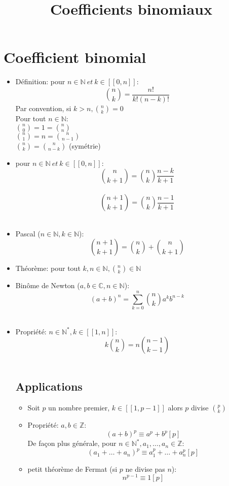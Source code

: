 \documentclass{article}
\title{Coefficients binomiaux}
\date{}
\begin{document}
\maketitle

\section{Coefficient binomial}
\begin{itemize}
	\item D\'{e}finition: pour \(n \in \mathbb{N}\ et\ k \in [\![0,n]\!]\): \\
	\[ \binom{n}{k} = \frac{n!}{k!(n-k)!} \]
	Par convention, si \(k>n, \binom{n}{k} = 0\) \\
	Pour tout \(n \in \mathbb{N}:\) \\
	\(\binom{n}{0} = 1 = \binom{n}{n}\) \\
	\(\binom{n}{1} = n = \binom{n}{n-1}\) \\
	\(\binom{n}{k} = \binom{n}{n-k}\) (sym\'{e}trie) \\
	\item pour \(n \in \mathbb{N}\ et\ k \in [\![0,n]\!]\): \\
	\[\binom{n}{k+1} = \binom{n}{k} \frac{n-k}{k+1}\] \\
	\[\binom{n+1}{k+1} = \binom{n}{k} \frac{n-1}{k+1}\] \\
	\item Pascal (\(n \in \mathbb{N}, k \in \mathbb{N}\)): \\
	\[\binom{n+1}{k+1} = \binom{n}{k} + \binom{n}{k+1}\]
	\item Th\'{e}or\`{e}me: pour tout \(k,n \in \mathbb{N}, \binom{n}{k} \in \mathbb{N}\) \\
	\item Bin\^{o}me de Newton (\(a,b \in \mathbb{C}, n \in \mathbb{N}\)): \\
	\[(a+b)^n = \sum_{k=0}^{n} \binom{n}{k}a^kb^{n-k}\] \\
	\item Propri\'{e}t\'{e}: \(n \in \mathbb{N}^*, k \in [\![1,n]\!]\): \\
	\[k\binom{n}{k} = n\binom{n-1}{k-1}\] \\
	\subsection{Applications}
	\begin{itemize}
		\item Soit \(p\) un nombre premier, \(k \in [\![1,p-1]\!]\) alors \(p\) divise \(\binom{p}{k}\) \\
		\item Propri\'{e}t\'{e}: \(a,b \in \mathbb{Z}\): \\
		\[(a+b)^p \equiv a^p + b^p [p]\]
		De fa\c{c}on plus g\'{e}n\'{e}rale, pour \(n \in \mathbb{N}^*, a_1, \hdots, a_n \in \mathbb{Z}\): \\
		\[(a_1+\hdots+a_n)^p \equiv a_1^p+\hdots+a_n^p [p]\]
		\item petit th\'{e}or\`{e}me de Fermat (si \(p\) ne divise pas \(n\)): \\
		\[n^{p-1} \equiv 1[p] \]
	\end{itemize}
\end{itemize}
\end{document}
